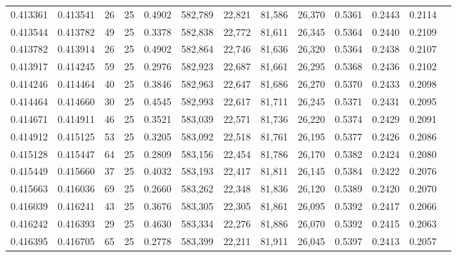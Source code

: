 \begin{tabular}{rrrrrrrrrrrrr}
0.413361 & 0.413541 &    26 &  25 &                                     0.4902 & 582,789 &  22,821 &  81,586 &  26,370 & 0.5361 & 0.2443 & 0.2114 \\
0.413544 & 0.413782 &    49 &  25 &                                     0.3378 & 582,838 &  22,772 &  81,611 &  26,345 & 0.5364 & 0.2440 & 0.2109 \\
0.413782 & 0.413914 &    26 &  25 &                                     0.4902 & 582,864 &  22,746 &  81,636 &  26,320 & 0.5364 & 0.2438 & 0.2107 \\
0.413917 & 0.414245 &    59 &  25 &                                     0.2976 & 582,923 &  22,687 &  81,661 &  26,295 & 0.5368 & 0.2436 & 0.2102 \\
0.414246 & 0.414464 &    40 &  25 &                                     0.3846 & 582,963 &  22,647 &  81,686 &  26,270 & 0.5370 & 0.2433 & 0.2098 \\
0.414464 & 0.414660 &    30 &  25 &                                     0.4545 & 582,993 &  22,617 &  81,711 &  26,245 & 0.5371 & 0.2431 & 0.2095 \\
0.414671 & 0.414911 &    46 &  25 &                                     0.3521 & 583,039 &  22,571 &  81,736 &  26,220 & 0.5374 & 0.2429 & 0.2091 \\
0.414912 & 0.415125 &    53 &  25 &                                     0.3205 & 583,092 &  22,518 &  81,761 &  26,195 & 0.5377 & 0.2426 & 0.2086 \\
0.415128 & 0.415447 &    64 &  25 &                                     0.2809 & 583,156 &  22,454 &  81,786 &  26,170 & 0.5382 & 0.2424 & 0.2080 \\
0.415449 & 0.415660 &    37 &  25 &                                     0.4032 & 583,193 &  22,417 &  81,811 &  26,145 & 0.5384 & 0.2422 & 0.2076 \\
0.415663 & 0.416036 &    69 &  25 &                                     0.2660 & 583,262 &  22,348 &  81,836 &  26,120 & 0.5389 & 0.2420 & 0.2070 \\
0.416039 & 0.416241 &    43 &  25 &                                     0.3676 & 583,305 &  22,305 &  81,861 &  26,095 & 0.5392 & 0.2417 & 0.2066 \\
0.416242 & 0.416393 &    29 &  25 &                                     0.4630 & 583,334 &  22,276 &  81,886 &  26,070 & 0.5392 & 0.2415 & 0.2063 \\
0.416395 & 0.416705 &    65 &  25 &                                     0.2778 & 583,399 &  22,211 &  81,911 &  26,045 & 0.5397 & 0.2413 & 0.2057 \\

\end{tabular}
